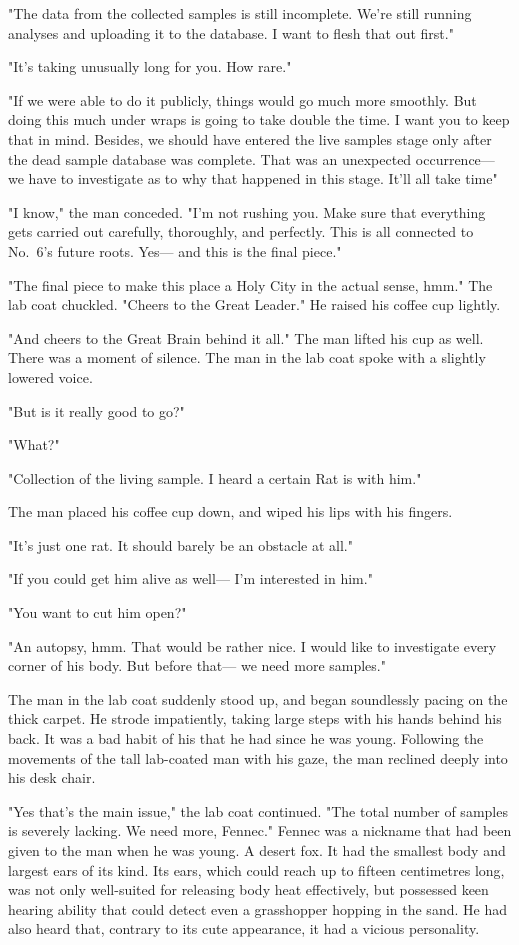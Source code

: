 "The data from the collected samples is still incomplete. We're still
running analyses and uploading it to the database. I want to flesh that
out first."

"It's taking unusually long for you. How rare."

"If we were able to do it publicly, things would go much more smoothly.
But doing this much under wraps is going to take double the time. I want
you to keep that in mind. Besides, we should have entered the live
samples stage only after the dead sample database was complete. That was
an unexpected occurrence--- we have to investigate as to why that happened
in this stage. It'll all take time\el "

"I know," the man conceded. "I'm not rushing you. Make sure that
everything gets carried out carefully, thoroughly, and perfectly. This
is all connected to No.~6's future roots. Yes--- and this is the final
piece."

"The final piece to make this place a Holy City in the actual sense,
hmm." The lab coat chuckled. "Cheers to the Great Leader." He raised his
coffee cup lightly.

"And cheers to the Great Brain behind it all." The man lifted his cup as
well. There was a moment of silence. The man in the lab coat spoke with
a slightly lowered voice.

"But is it really good to go?"

"What?"

"Collection of the living sample. I heard a certain Rat is with him."

The man placed his coffee cup down, and wiped his lips with his fingers.

"It's just one rat. It should barely be an obstacle at all."

"If you could get him alive as well--- I'm interested in him."

"You want to cut him open?"

"An autopsy, hmm. That would be rather nice. I would like to investigate
every corner of his body. But before that--- we need more samples."

The man in the lab coat suddenly stood up, and began soundlessly pacing
on the thick carpet. He strode impatiently, taking large steps with his
hands behind his back. It was a bad habit of his that he had since he
was young. Following the movements of the tall lab-coated man with his
gaze, the man reclined deeply into his desk chair.

"Yes that's the main issue," the lab coat continued. "The total number
of samples is severely lacking. We need more, Fennec." Fennec was a
nickname that had been given to the man when he was young. A desert fox.
It had the smallest body and largest ears of its kind. Its ears, which
could reach up to fifteen centimetres long, was not only well-suited for
releasing body heat effectively, but possessed keen hearing ability that
could detect even a grasshopper hopping in the sand. He had also heard
that, contrary to its cute appearance, it had a vicious personality.

